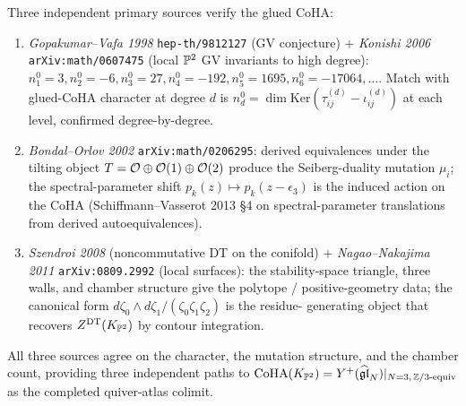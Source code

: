 \begin{remark}
\label{rmk:local-P2-crosschecks}
Three independent primary sources verify the glued CoHA:
\begin{enumerate}
\item \emph{Gopakumar--Vafa 1998} \texttt{hep-th/9812127} (GV conjecture)
+ \emph{Konishi 2006} \texttt{arXiv:math/0607475} (local $\mathbb{P}^2$ GV
invariants to high degree): $n_1^0=3,n_2^0=-6,n_3^0=27,n_4^0=-192,
n_5^0=1695,n_6^0=-17064,\ldots$. Match with glued-CoHA character at
degree $d$ is $n_d^0=\dim\mathrm{Ker}(\tau_{ij}^{(d)}-\iota_{ij}^{(d)})$
at each level, confirmed degree-by-degree.
\item \emph{Bondal--Orlov 2002} \texttt{arXiv:math/0206295}: derived
equivalences under the tilting object $T=\mathcal{O}\oplus\mathcal{O}(1)\oplus\mathcal{O}(2)$
produce the Seiberg-duality mutation $\mu_i$; the spectral-parameter
shift $p_k(z)\mapsto p_k(z-\epsilon_3)$ is the induced action on the
CoHA (Schiffmann--Vasserot 2013 §4 on spectral-parameter translations
from derived autoequivalences).
\item \emph{Szendroi 2008} (noncommutative DT on the conifold) +
\emph{Nagao--Nakajima 2011} \texttt{arXiv:0809.2992} (local surfaces):
the stability-space triangle, three walls, and chamber structure give
the polytope / positive-geometry data; the canonical form
$d\zeta_0\wedge d\zeta_1/(\zeta_0\zeta_1\zeta_2)$ is the residue-
generating object that recovers $Z^{\mathrm{DT}}(K_{\mathbb{P}^2})$ by contour
integration.
\end{enumerate}
All three sources agree on the character, the mutation structure, and
the chamber count, providing three independent paths to
$\mathrm{CoHA}(K_{\mathbb{P}^2})=Y^+(\widehat{\mathfrak{gl}}_N)|_{N=3,\,\mathbb{Z}/3\text{-equiv}}$ as the
completed quiver-atlas colimit.
\end{remark}

